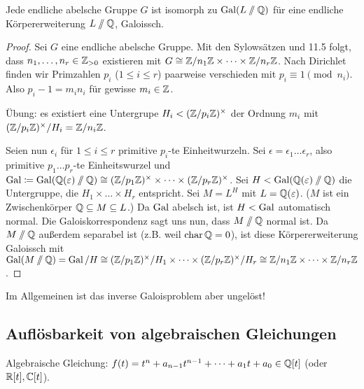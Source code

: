 \documentclass[12pt,a4paper]{scrartcl}
\begin{document}
\begin{satz}\label{thm:25.3}
	Jede endliche abelsche Gruppe $G$ ist isomorph zu $\operatorname{Gal}(L\sslash \mathbb Q)$ für eine endliche Körpererweiterung $L\sslash \mathbb Q$, Galoissch.
\end{satz}
\begin{proof}
	Sei $G$ eine endliche abelsche Gruppe. Mit den Sylowsätzen und 11.5 folgt, dass $n_1,\dots, n_r\in\mathbb Z_{>0}$ existieren mit $G\cong \mathbb Z/n_1\mathbb Z\times\dots \times \mathbb Z/n_r\mathbb Z$. Nach Dirichlet finden wir Primzahlen $p_i$ ($1\leq i\leq r$) paarweise verschieden mit $p_i\equiv 1\pmod n_i$. Also $p_i-1 = m_in_i$ für gewisse $m_i\in\mathbb Z$.
	
	Übung: es existiert eine Untergrupe $H_i<(\mathbb Z/p_i\mathbb Z)^{\times}$ der Ordnung $m_i$ mit $(\mathbb Z/p_i\mathbb Z)^{\times}/H_i = \mathbb Z/n_i\mathbb Z$.
	
	Seien nun $\epsilon_i$ für $1\leq i\leq r$ primitive $p_i$-te Einheitwurzeln. Sei $\epsilon = \epsilon_1\dots \epsilon_r$, also primitive $p_1\dots p_r$-te Einheitswurzel und $\operatorname{Gal}\coloneqq\operatorname{Gal}(\mathbb Q(\varepsilon)\sslash \mathbb Q)\cong (\mathbb Z/p_1\mathbb Z)^{\times}\times\dots \times(\mathbb Z/p_r\mathbb Z)^{\times}$.
	Sei $H< \operatorname{Gal}(\mathbb Q(\varepsilon)\sslash \mathbb Q)$ die Untergruppe, die $H_1\times\dots\times H_r$ entspricht.
	Sei $M = L^H$ mit $L = \mathbb Q(\varepsilon)$. ($M$ ist ein Zwischenkörper $\mathbb Q\subseteq M\subseteq L$.) Da $\operatorname{Gal}$ abelsch ist, ist $H<\operatorname{Gal}$ automatisch normal. Die Galoiskorrespondenz sagt uns nun, dass $M\sslash \mathbb Q$ normal ist. Da $M\sslash \mathbb Q$ außerdem separabel ist (z.B. weil $\operatorname{char}\mathbb Q=0$), ist diese Körpererweiterung Galoissch mit
	$\operatorname{Gal}(M\sslash \mathbb Q) = \operatorname{Gal}/H\cong (\mathbb Z/p_1\mathbb Z)^{\times}/H_1\times\dots\times(\mathbb Z/p_r\mathbb Z)^{\times}/H_r\cong \mathbb Z/n_1\mathbb Z\times\dots\times\mathbb Z/n_r\mathbb Z$.
\end{proof}
Im Allgemeinen ist das inverse Galoisproblem aber ungelöst!

\subsection{Auflösbarkeit von algebraischen Gleichungen}
Algebraische Gleichung: $f(t) = t^n+a_{n-1}t^{n-1}+\dots+a_1t+a_0\in\mathbb Q[t]$ (oder $\mathbb R[t],\mathbb C[t]$).
\end{document}
